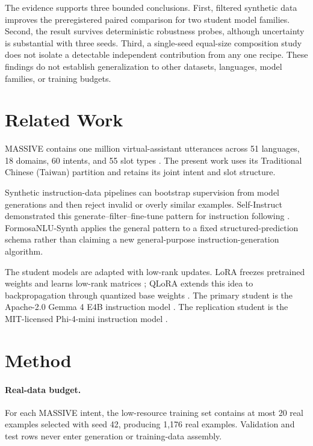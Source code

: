 \documentclass[11pt]{article}
\begin{document}
The evidence supports three bounded conclusions.  First, filtered synthetic data
improves the preregistered paired comparison for two student model families.
Second, the result survives deterministic robustness probes, although uncertainty
is substantial with three seeds.  Third, a single-seed equal-size composition
study does not isolate a detectable independent contribution from any one recipe.
These findings do not establish generalization to other datasets, languages,
model families, or training budgets.

\section{Related Work}
MASSIVE contains one million virtual-assistant utterances across 51 languages,
18 domains, 60 intents, and 55 slot types \citep{fitzgerald2023massive}.  The
present work uses its Traditional Chinese (Taiwan) partition and retains its
joint intent and slot structure.

Synthetic instruction-data pipelines can bootstrap supervision from model
generations and then reject invalid or overly similar examples.  Self-Instruct
demonstrated this generate--filter--fine-tune pattern for instruction following
\citep{wang2023selfinstruct}.  FormosaNLU-Synth applies the general pattern to a
fixed structured-prediction schema rather than claiming a new general-purpose
instruction-generation algorithm.

The student models are adapted with low-rank updates.  LoRA freezes pretrained
weights and learns low-rank matrices \citep{hu2022lora}; QLoRA extends this idea
to backpropagation through quantized base weights \citep{dettmers2023qlora}.
The primary student is the Apache-2.0 Gemma 4 E4B instruction model
\citep{gemma4modelcard}.  The replication student is the MIT-licensed
Phi-4-mini instruction model \citep{phi4minimodelcard}.

\section{Method}
\paragraph{Real-data budget.}
For each MASSIVE intent, the low-resource training set contains at most 20 real
examples selected with seed 42, producing 1,176 real examples.  Validation and
test rows never enter generation or training-data assembly.
\end{document}
